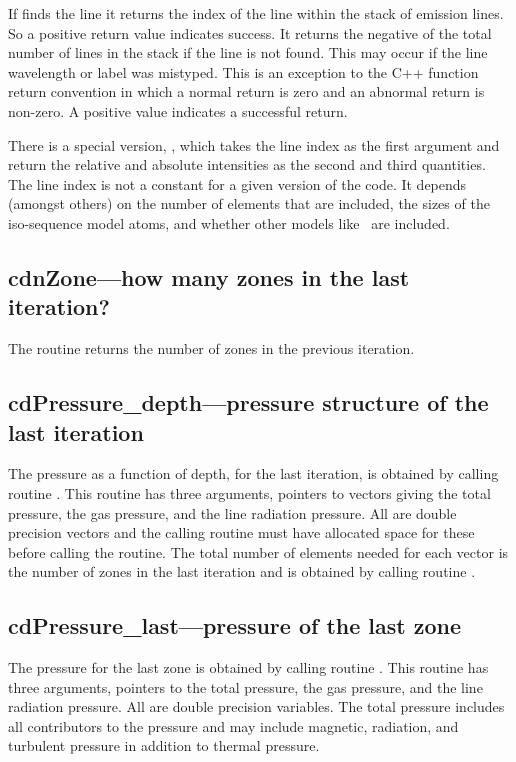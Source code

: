 If  finds the line it returns the index of the line within the
stack of emission lines.
So a positive return value indicates success.
It returns the negative of the total number of lines in the stack if the
line is not found.  This may occur if the line wavelength or label was
mistyped.  This is an exception to the C++ function return convention in
which a normal return is zero and an abnormal return is non-zero.  A positive
value indicates a successful return.

There is a special version, ,  which takes the line index as
the first argument and return the relative and absolute intensities as the
second and third quantities.  The line index is not a constant for a given
version of the code.  It depends (amongst others) on the number of elements that are included,
the sizes of the iso-sequence model atoms, and whether other models like
\htwo\ are included.

\subsection{cdnZone---how many zones in the last iteration?}

The routine returns the number of zones in the previous iteration.

\subsection{cdPressure\_depth---pressure structure of the last iteration }

The pressure as a function of depth, for the last iteration, is obtained
by calling routine .  This routine has three arguments,
pointers to vectors giving the total pressure, the gas pressure, and the
line radiation pressure.  All are double precision vectors and the calling
routine must have allocated space for these before calling the routine.
The total number of elements needed for each vector is the number of zones
in the last iteration and is obtained by calling routine .

\subsection{cdPressure\_last---pressure of the last zone }

The pressure for the last zone is obtained by calling routine
.
This routine has three arguments, pointers to the total
pressure, the gas pressure, and the line radiation pressure.
All are double
precision variables.
The total pressure includes all contributors to the
pressure and may include magnetic, radiation, and turbulent pressure in
addition to thermal pressure.

